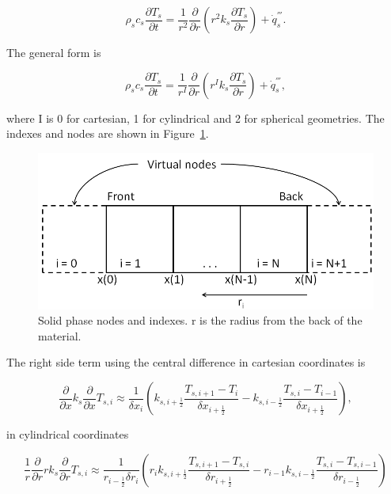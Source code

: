 \begin{equation}
\label{heat_cond_spher}
     \rho_s c_s \frac{\partial T_s}{\partial t} = \frac{1}{r^2}\frac{\partial}{\partial r} (r^2 k_s \frac{\partial T_s}{\partial r}) + \dot{q}^{'''}_s. 
\end{equation}
 
The general form is

\begin{equation}
\label{heat_cond_cyl2}
     \rho_s c_s \frac{\partial T_s}{\partial t} = \frac{1}{r^I}\frac{\partial}{\partial r} (r^I k_s \frac{\partial T_s}{\partial r}) + \dot{q}^{'''}_s, 
\end{equation}

where I is 0 for cartesian, 1 for cylindrical and 2 for spherical geometries. The indexes and nodes are shown in Figure~\ref{fig_solid_nodes}.

\begin{figure}[ht]
    \centering
    \includegraphics[width=5.0in]{FIGURES/appendix_I_solid_nodes.png}
    \caption{Solid phase nodes and indexes. r is the radius from the back of the material.}
    \label{fig_solid_nodes}
\end{figure}

The right side term using the central difference in cartesian coordinates is

\begin{equation}
\label{T_cart}
    \frac{\partial}{\partial x} k_s \frac{\partial}{\partial x} T_{s,i} 
    \approx \frac{1}{\delta x_i}(k_{s,i+\frac{1}{2}}\frac{T_{s,i+1}-T_{i}}{\delta x_{i+\frac{1}{2}}}-k_{s, i-\frac{1}{2}}\frac{T_{s,i}-T_{i-1}}{\delta x_{i+\frac{1}{2}}}),
\end{equation}

in cylindrical coordinates

\begin{equation}
\label{T_cyl}
    \frac{1}{r}\frac{\partial}{\partial r} rk_s \frac{\partial}{\partial r} T_{s,i} 
    \approx \frac{1}{r_{i-\frac{1}{2}} \delta r_i}(r_{i}k_{s,i+\frac{1}{2}}\frac{T_{s,i+1}-T_{s,i}}{\delta r_{i+\frac{1}{2}}}-r_{i-1}k_{s,i-\frac{1}{2}}\frac{T_{s,i}-T_{s,i-1}}{\delta r_{i-\frac{1}{2}}})
\end{equation}


